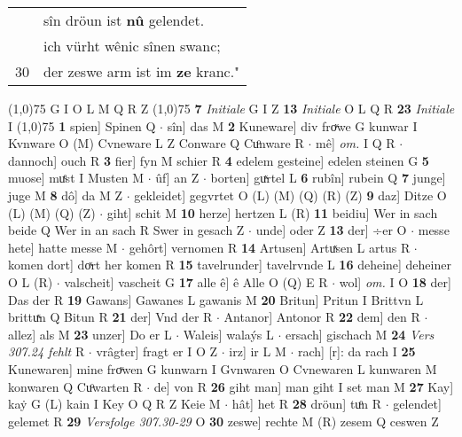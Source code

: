 \documentclass[8pt,a4paper,notitlepage]{article}
\begin{document}
\begin{table}[ht]
\begin{minipage}[t]{0.5\linewidth}
\begin{tabular}{rl}
 & sîn dröun ist \textbf{nû} gelendet.\\ 
 & ich vürht wênic sînen swanc;\\ 
30 & der zeswe arm ist im \textbf{ze} kranc."\\ 
\end{tabular}
\scriptsize
\line(1,0){75} \newline
G I O L M Q R Z \newline
\line(1,0){75} \newline
\textbf{7} \textit{Initiale} G I Z  \textbf{13} \textit{Initiale} O L Q R  \textbf{23} \textit{Initiale} I  \newline
\line(1,0){75} \newline
\textbf{1} spien] Spinen Q  $\cdot$ sîn] das M \textbf{2} Kuneware] div froͮwe G kunwar I Kvnware O (M) Cvneware L Z Conware Q Cuͦnware R  $\cdot$ mê] \textit{om.} I Q R  $\cdot$ dannoch] ouch R \textbf{3} fier] fyn M schier R \textbf{4} edelem gesteine] edelen steinen G \textbf{5} muose] muͤst I Musten M  $\cdot$ ûf] an Z  $\cdot$ borten] guͯrtel L \textbf{6} rubîn] rubein Q \textbf{7} junge] juge M \textbf{8} dô] da M Z  $\cdot$ gekleidet] gegvrtet O (L) (M) (Q) (R) (Z) \textbf{9} daz] Ditze O (L) (M) (Q) (Z)  $\cdot$ giht] schit M \textbf{10} herze] hertzen L (R) \textbf{11} beidiu] Wer in sach beide Q Wer in an sach R Swer in gesach Z  $\cdot$ unde] oder Z \textbf{13} der] ÷er O  $\cdot$ messe hete] hatte messe M  $\cdot$ gehôrt] vernomen R \textbf{14} Artusen] Artuͯsen L artus R  $\cdot$ komen dort] doͯrt her komen R \textbf{15} tavelrunder] tavelrvnde L \textbf{16} deheine] deheiner O L (R)  $\cdot$ valscheit] vascheit G \textbf{17} alle ê] ê Alle O (Q) E R  $\cdot$ wol] \textit{om.} I O \textbf{18} der] Das der R \textbf{19} Gawans] Gawanes L gawanis M \textbf{20} Britun] Pritun I Brittvn L brittuͯn Q Bitun R \textbf{21} der] Vnd der R  $\cdot$ Antanor] Antonor R \textbf{22} dem] den R  $\cdot$ allez] als M \textbf{23} unzer] Do er L  $\cdot$ Waleis] walaýs L  $\cdot$ ersach] gischach M \textbf{24} \textit{Vers 307.24 fehlt} R   $\cdot$ vrâgter] fragt er I O Z  $\cdot$ irz] ir L M  $\cdot$ rach] [r]: da rach I \textbf{25} Kunewaren] mine froͮwen G kunwarn I Gvnwaren O Cvnewaren L kunwaren M konwaren Q Cuͦwarten R  $\cdot$ de] von R \textbf{26} giht man] man giht I set man M \textbf{27} Kay] kaẏ G (L) kain I Key O Q R Z Keie M  $\cdot$ hât] het R \textbf{28} dröun] tuͦn R  $\cdot$ gelendet] gelemet R \textbf{29} \textit{Versfolge 307.30-29} O  \textbf{30} zeswe] rechte M (R) zesem Q ceswen Z \newline

\end{minipage}
\end{table}
\end{document}
